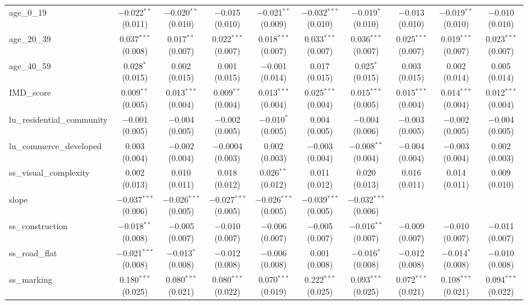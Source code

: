 \begin{table}[!htbp]
\begin{tabular}{@{\extracolsep{1pt}}lccccccccc}
  age\_0\_19 & $-$0.022$^{**}$ (0.011) & $-$0.020$^{**}$ (0.010) & $-$0.015 (0.010) & $-$0.021$^{**}$ (0.009) & $-$0.032$^{***}$ (0.010) & $-$0.019$^{*}$ (0.010) & $-$0.013 (0.010) & $-$0.019$^{**}$ (0.010) & $-$0.010 (0.010) \\ 
  age\_20\_39 & 0.037$^{***}$ (0.008) & 0.017$^{**}$ (0.007) & 0.022$^{***}$ (0.007) & 0.018$^{***}$ (0.007) & 0.033$^{***}$ (0.007) & 0.036$^{***}$ (0.007) & 0.025$^{***}$ (0.007) & 0.019$^{***}$ (0.007) & 0.023$^{***}$ (0.007) \\ 
  age\_40\_59 & 0.028$^{*}$ (0.015) & 0.002 (0.015) & 0.001 (0.015) & $-$0.001 (0.014) & 0.017 (0.015) & 0.025$^{*}$ (0.015) & 0.003 (0.015) & 0.002 (0.014) & 0.005 (0.014) \\ 
  IMD\_score & 0.009$^{**}$ (0.005) & 0.013$^{***}$ (0.004) & 0.009$^{**}$ (0.004) & 0.013$^{***}$ (0.004) & 0.025$^{***}$ (0.004) & 0.015$^{***}$ (0.005) & 0.015$^{***}$ (0.004) & 0.014$^{***}$ (0.004) & 0.012$^{***}$ (0.004) \\ 
  lu\_residential\_community & $-$0.001 (0.005) & $-$0.004 (0.005) & $-$0.002 (0.005) & $-$0.010$^{*}$ (0.005) & 0.004 (0.005) & $-$0.004 (0.006) & $-$0.003 (0.005) & $-$0.002 (0.005) & $-$0.004 (0.005) \\ 
  lu\_commerce\_developed & 0.003 (0.004) & $-$0.002 (0.004) & $-$0.0004 (0.003) & 0.002 (0.003) & $-$0.003 (0.004) & $-$0.008$^{**}$ (0.004) & $-$0.004 (0.004) & $-$0.003 (0.004) & 0.002 (0.003) \\ 
  ss\_visual\_complexity & 0.002 (0.013) & 0.010 (0.011) & 0.018 (0.012) & 0.026$^{**}$ (0.012) & 0.011 (0.012) & 0.020 (0.013) & 0.016 (0.011) & 0.014 (0.011) & 0.009 (0.010) \\ 
  slope & $-$0.037$^{***}$ (0.006) & $-$0.026$^{***}$ (0.005) & $-$0.027$^{***}$ (0.005) & $-$0.026$^{***}$ (0.005) & $-$0.039$^{***}$ (0.005) & $-$0.032$^{***}$ (0.006) &  &  &  \\ 
  ss\_construction & $-$0.018$^{**}$ (0.008) & $-$0.005 (0.007) & $-$0.010 (0.007) & $-$0.006 (0.007) & $-$0.005 (0.007) & $-$0.016$^{**}$ (0.007) & $-$0.009 (0.007) & $-$0.010 (0.007) & $-$0.011 (0.007) \\ 
  ss\_road\_flat & $-$0.021$^{***}$ (0.008) & $-$0.013$^{*}$ (0.008) & $-$0.012 (0.008) & $-$0.006 (0.008) & 0.001 (0.008) & $-$0.016$^{*}$ (0.008) & $-$0.012 (0.008) & $-$0.014$^{*}$ (0.008) & $-$0.010 (0.008) \\ 
  ss\_marking & 0.180$^{***}$ (0.025) & 0.080$^{***}$ (0.021) & 0.080$^{***}$ (0.022) & 0.070$^{***}$ (0.019) & 0.222$^{***}$ (0.025) & 0.093$^{***}$ (0.025) & 0.072$^{***}$ (0.021) & 0.108$^{***}$ (0.021) & 0.094$^{***}$ (0.022) \\ 

\end{tabular}
\end{table}

